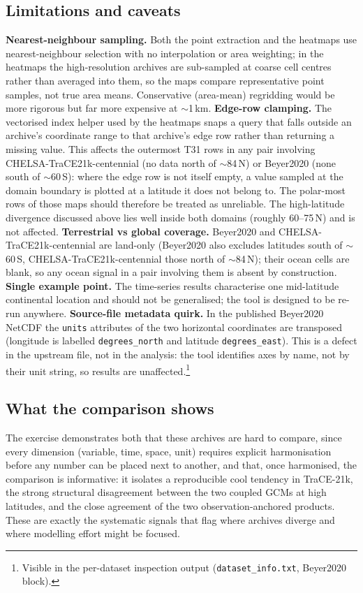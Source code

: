 \documentclass{isprs}
\newcommand{\dg}{\textdegree}
\newcommand{\tabbr}[1]{\texttt{#1}}
\begin{document}
\subsection{Limitations and caveats}
\label{sec:caveats}
\textbf{Nearest-neighbour sampling.} Both the point extraction and the heatmaps use nearest-neighbour selection with no interpolation or area weighting; in the heatmaps the high-resolution archives are sub-sampled at coarse cell centres rather than averaged into them, so the maps compare representative point samples, not true area means. Conservative (area-mean) regridding would be more rigorous but far more expensive at $\sim$1\,km. \textbf{Edge-row clamping.} The vectorised index helper used by the heatmaps snaps a query that falls outside an archive's coordinate range to that archive's edge row rather than returning a missing value. This affects the outermost T31 rows in any pair involving CHELSA-TraCE21k-centennial (no data north of $\sim$84\dg\,N) or Beyer2020 (none south of $\sim$60\dg\,S): where the edge row is not itself empty, a value sampled at the domain boundary is plotted at a latitude it does not belong to. The polar-most rows of those maps should therefore be treated as unreliable. The high-latitude divergence discussed above lies well inside both domains (roughly 60--75\dg\,N) and is not affected. \textbf{Terrestrial vs global coverage.} Beyer2020 and CHELSA-TraCE21k-centennial are land-only (Beyer2020 also excludes latitudes south of $\sim$60\dg\,S, CHELSA-TraCE21k-centennial those north of $\sim$84\dg\,N); their ocean cells are blank, so any ocean signal in a pair involving them is absent by construction. \textbf{Single example point.} The time-series results characterise one mid-latitude continental location and should not be generalised; the tool is designed to be re-run anywhere. \textbf{Source-file metadata quirk.} In the published Beyer2020 NetCDF the \tabbr{units} attributes of the two horizontal coordinates are transposed (longitude is labelled \tabbr{degrees\_north} and latitude \tabbr{degrees\_east}). This is a defect in the upstream file, not in the analysis: the tool identifies axes by name, not by their unit string, so results are unaffected.\footnote{Visible in the per-dataset inspection output (\tabbr{dataset\_info.txt}, Beyer2020 block).}

\subsection{What the comparison shows}
The exercise demonstrates both that these archives are hard to compare, since every dimension (variable, time, space, unit) requires explicit harmonisation before any number can be placed next to another, and that, once harmonised, the comparison is informative: it isolates a reproducible cool tendency in TraCE-21k, the strong structural disagreement between the two coupled GCMs at high latitudes, and the close agreement of the two observation-anchored products. These are exactly the systematic signals that flag where archives diverge and where modelling effort might be focused.
\end{document}
